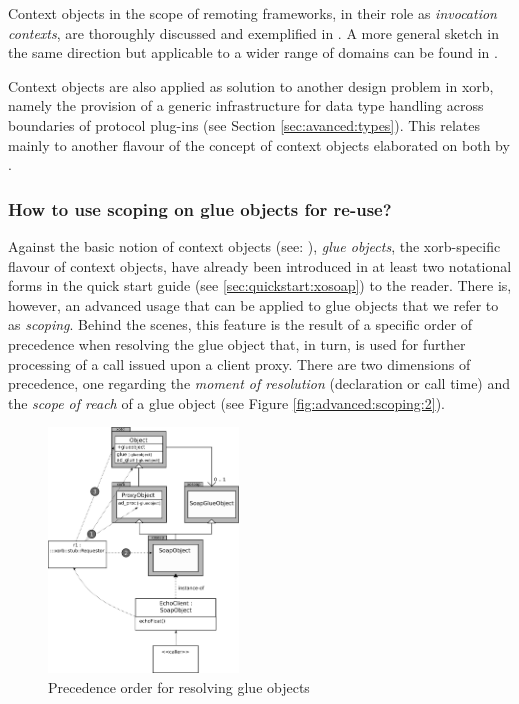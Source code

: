 Context objects in the scope of remoting frameworks, in their role as \emph{invocation contexts}, are thoroughly discussed and exemplified in \cite{zdun:2005}. A more general sketch in the same direction but applicable to a wider range of domains can be found in \cite{kelly:2003}.

Context objects are also applied as solution to another design problem in xorb, namely the provision of a generic infrastructure for data type handling across boundaries of protocol plug-ins (see Section \ref{sec:avanced:types}). This relates mainly to another flavour of the concept of context objects elaborated on both by \cite{maetzel:1996,sommerlad:1998}. 
  
  \subsubsection{How to use scoping on glue objects for re-use?}\label{sec:advanced:xorb:gobjects:why}
  Against the basic notion of context objects (see: ), \emph{glue objects}, the xorb-specific flavour of context objects, have already been introduced in at least two notational forms in the quick start guide (see \ref{sec:quickstart:xosoap}) to the reader. There is, however, an advanced usage that can be applied to glue objects that we refer to as \emph{scoping}. Behind the scenes, this feature is the result of a specific order of precedence when resolving the glue object that, in turn, is used for further processing of a call issued upon a client proxy. There are two dimensions of precedence, one regarding the \emph{moment of resolution} (declaration or call time) and the \emph{scope of reach} of a glue object (see Figure \ref{fig:advanced:scoping:2}).
  \begin{figure}[htbp]
\begin{center}
\includegraphics[width=0.45\textwidth]{img/scoping-glue-objects-structure.png}
\caption{Precedence order for resolving glue objects}
\label{fig:advanced:scoping:1}
\end{center}
\end{figure}
